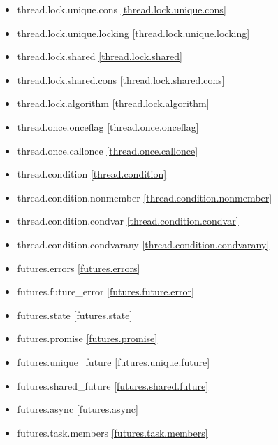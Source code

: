 \begin{multicols}{2}
\begin{itemize}
\item{thread.lock.unique.cons               \ref{thread.lock.unique.cons}}
\item{thread.lock.unique.locking            \ref{thread.lock.unique.locking}}
\item{thread.lock.shared                    \ref{thread.lock.shared}}
\item{thread.lock.shared.cons               \ref{thread.lock.shared.cons}}
\item{thread.lock.algorithm                 \ref{thread.lock.algorithm}}
\item{thread.once.onceflag                  \ref{thread.once.onceflag}}
\item{thread.once.callonce                  \ref{thread.once.callonce}}
\item{thread.condition                      \ref{thread.condition}}
\item{thread.condition.nonmember            \ref{thread.condition.nonmember}}
\item{thread.condition.condvar              \ref{thread.condition.condvar}}
\item{thread.condition.condvarany           \ref{thread.condition.condvarany}}
\item{futures.errors                        \ref{futures.errors}}
\item{futures.future_error                  \ref{futures.future.error}}
\item{futures.state                         \ref{futures.state}}
\item{futures.promise                       \ref{futures.promise}}
\item{futures.unique_future                 \ref{futures.unique.future}}
\item{futures.shared_future                 \ref{futures.shared.future}}
\item{futures.async                         \ref{futures.async}}
\item{futures.task.members                  \ref{futures.task.members}}

\end{itemize}
\end{multicols}


\vspace*{\fill}

